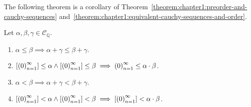 The following theorem is a corollary of Theorem~\ref{theorem:chapter1:preorder-and-cauchy-sequences} and~\ref{theorem:chapter1:equivalent-cauchy-sequences-and-order}.

\begin{theorem}\label{theorem:chapter1:compatibility-of-operation-and-order}
    Let $\alpha, \beta, \gamma\in\mathscr{C}_{\mathbb{Q}}$.
    \begin{enumerate}[label={(\roman*)}]
        \item $\alpha \le \beta \implies \alpha + \gamma \le \beta + \gamma$.
        \item $\left[{{\left({0}\right)}^{\infty}_{n=1}}\right]\le\alpha\land\left[{{\left({0}\right)}^{\infty}_{n=1}}\right]\le\beta \implies {\left({0}\right)}^{\infty}_{n=1}\le\alpha\cdot\beta$.
        \item $\alpha < \beta \implies \alpha + \gamma < \beta + \gamma$.
        \item $\left[{{\left({0}\right)}^{\infty}_{n=1}}\right] < \alpha \land \left[{{\left({0}\right)}^{\infty}_{n=1}}\right] < \beta \implies \left[{{\left({0}\right)}^{\infty}_{n=1}}\right] < \alpha\cdot\beta$.
    \end{enumerate}
\end{theorem}

